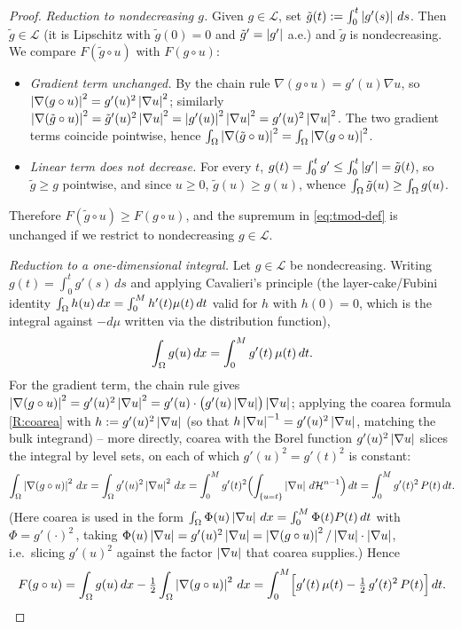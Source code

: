 \begin{proof}
\emph{Reduction to nondecreasing $g$.} Given $g\in\mathcal L$, set
$\tilde g(t):=\int_0^t\left|g'(s)\right|\,ds$. Then $\tilde g\in\mathcal L$ (it is
Lipschitz with $\tilde g(0)=0$ and $\tilde g'=\left|g'\right|$ a.e.) and
$\tilde g$ is nondecreasing. We compare $F(\tilde g\circ u)$ with
$F(g\circ u)$:
\begin{itemize}
\item \emph{Gradient term unchanged.} By the chain rule
$\nabla(g\circ u)=g'(u)\nabla u$, so $\left|\nabla(g\circ u)\right|^2
=g'(u)^2\left|\nabla u\right|^2$; similarly $\left|\nabla(\tilde g\circ u)\right|^2
=\tilde g'(u)^2\left|\nabla u\right|^2=\left|g'(u)\right|^2\left|\nabla u\right|^2
=g'(u)^2\left|\nabla u\right|^2$. The two gradient terms coincide pointwise, hence
$\int_\Omega\left|\nabla(\tilde g\circ u)\right|^2=\int_\Omega\left|\nabla(g\circ u)\right|^2$.
\item \emph{Linear term does not decrease.} For every $t$,
$g(t)=\int_0^t g'\le\int_0^t\left|g'\right|=\tilde g(t)$, so $\tilde g\ge g$
pointwise, and since $u\ge0$, $\tilde g(u)\ge g(u)$, whence
$\int_\Omega\tilde g(u)\ge\int_\Omega g(u)$.
\end{itemize}
Therefore $F(\tilde g\circ u)\ge F(g\circ u)$, and the supremum in
\eqref{eq:tmod-def} is unchanged if we restrict to nondecreasing
$g\in\mathcal L$.

\emph{Reduction to a one-dimensional integral.} Let $g\in\mathcal L$ be
nondecreasing. Writing $g(t)=\int_0^t g'(s)\,ds$ and applying Cavalieri's
principle (the layer-cake/Fubini identity
$\int_\Omega h(u)\,dx=\int_0^M h'(t)\mu(t)\,dt$ valid for $h$ with $h(0)=0$,
which is the integral against $-d\mu$ written via the distribution
function),
\[
  \int_\Omega g(u)\,dx=\int_0^M g'(t)\,\mu(t)\,dt .
\]
For the gradient term, the chain rule gives $\left|\nabla(g\circ u)\right|^2
=g'(u)^2\left|\nabla u\right|^2=g'(u)\cdot\bigl(g'(u)\left|\nabla u\right|\bigr)
\left|\nabla u\right|$; applying the coarea formula \ref{R:coarea} with
$h:=g'(u)^2\left|\nabla u\right|$ (so that $h\left|\nabla u\right|^{-1}=g'(u)^2\left|\nabla
u\right|$, matching the bulk integrand) -- more directly, coarea with the Borel
function $g'(u)^2\left|\nabla u\right|$ slices the integral by level sets, on each
of which $g'(u)^2=g'(t)^2$ is constant:
\[
  \int_\Omega\left|\nabla(g\circ u)\right|^2\,dx
  =\int_\Omega g'(u)^2\left|\nabla u\right|^2\,dx
  =\int_0^M g'(t)^2\Bigl(\int_{\{u=t\}}\left|\nabla u\right|\,d\mathcal H^{n-1}\Bigr)\,dt
  =\int_0^M g'(t)^2\,P(t)\,dt .
\]
(Here coarea is used in the form $\int_\Omega\Phi(u)\left|\nabla u\right|\,dx
=\int_0^M\Phi(t)P(t)\,dt$ with $\Phi=g'(\cdot)^2\,$, taking
$\Phi(u)\left|\nabla u\right|=g'(u)^2\left|\nabla u\right|=\left|\nabla(g\circ
u)\right|^2/\left|\nabla u\right|\cdot\left|\nabla u\right|$, i.e.\ slicing $g'(u)^2$ against the
factor $\left|\nabla u\right|$ that coarea supplies.) Hence
\[
  F(g\circ u)=\int_\Omega g(u)\,dx-\tfrac12\int_\Omega\left|\nabla(g\circ u)\right|^2\,dx
  =\int_0^M\Bigl[g'(t)\,\mu(t)-\tfrac12\,g'(t)^2\,P(t)\Bigr]\,dt .
\]


\end{proof}
